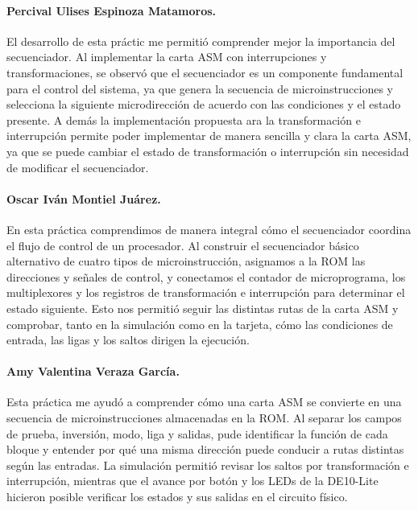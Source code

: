\documentclass[letterpaper,12pt]{article}
\begin{document}
\paragraph{Percival Ulises Espinoza Matamoros.} El desarrollo de esta práctic me permitió comprender mejor la importancia del secuenciador. Al implementar la carta ASM con interrupciones y transformaciones, se observó que el secuenciador es un componente fundamental para el control del sistema, ya que genera la secuencia de microinstrucciones y selecciona la siguiente microdirección de acuerdo con las condiciones y el estado presente. A demás la implementación propuesta ara la transformación e interrupción permite poder implementar de manera sencilla y clara la carta ASM, ya que se puede cambiar el estado de transformación o interrupción sin necesidad de modificar el secuenciador.

\paragraph{Oscar Iván Montiel Juárez.} En esta práctica comprendimos de manera integral cómo el secuenciador coordina el flujo de control de un procesador. Al construir el secuenciador básico alternativo de cuatro tipos de microinstrucción, asignamos a la ROM las direcciones y señales de control, y conectamos el contador de microprograma, los multiplexores y los registros de transformación e interrupción para determinar el estado siguiente. Esto nos permitió seguir las distintas rutas de la carta ASM y comprobar, tanto en la simulación como en la tarjeta, cómo las condiciones de entrada, las ligas y los saltos dirigen la ejecución.

\paragraph{Amy Valentina Veraza García.} Esta práctica me ayudó a comprender cómo una carta ASM se convierte en una secuencia de microinstrucciones almacenadas en la ROM. Al separar los campos de prueba, inversión, modo, liga y salidas, pude identificar la función de cada bloque y entender por qué una misma dirección puede conducir a rutas distintas según las entradas. La simulación permitió revisar los saltos por transformación e interrupción, mientras que el avance por botón y los LEDs de la DE10-Lite hicieron posible verificar los estados y sus salidas en el circuito físico.
\end{document}
